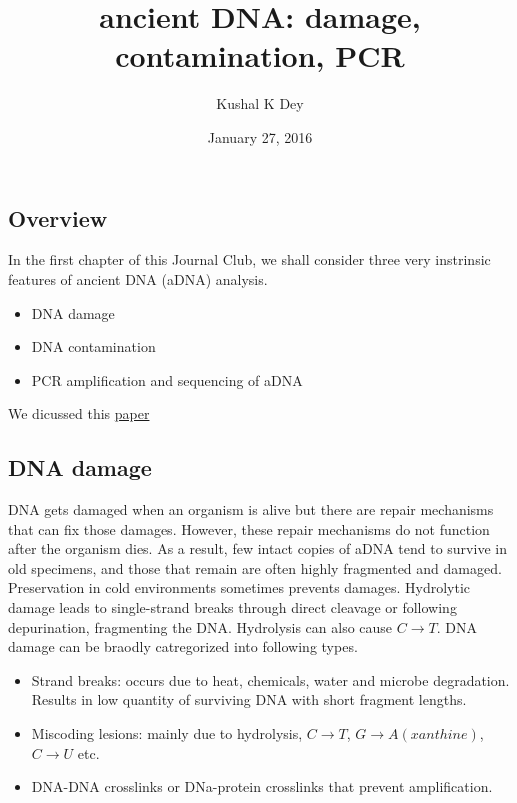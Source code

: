 \documentclass[]{article}
\title{ancient DNA: damage, contamination, PCR}
\author{Kushal K Dey}
\date{January 27, 2016}
\begin{document}
\maketitle


\subsection{Overview}\label{overview}

In the first chapter of this Journal Club, we shall consider three very
instrinsic features of ancient DNA (aDNA) analysis.

\begin{itemize}
\item DNA damage
\item DNA contamination 
\item PCR amplification and sequencing of aDNA 
\end{itemize}

We dicussed this
\href{http://journals.plos.org/plosone/article?id=10.1371/journal.pone.0034131}{paper}

\subsection{DNA damage}\label{dna-damage}

DNA gets damaged when an organism is alive but there are repair
mechanisms that can fix those damages. However, these repair mechanisms
do not function after the organism dies. As a result, few intact copies
of aDNA tend to survive in old specimens, and those that remain are
often highly fragmented and damaged. Preservation in cold environments
sometimes prevents damages. Hydrolytic damage leads to single-strand
breaks through direct cleavage or following depurination, fragmenting
the DNA. Hydrolysis can also cause \(C \rightarrow T\). DNA damage can
be braodly catregorized into following types.

\begin{itemize}
\item Strand breaks: occurs due to heat, chemicals, water and microbe degradation. Results in low quantity of surviving DNA with short fragment lengths. 
\item Miscoding lesions: mainly due to hydrolysis, $C \rightarrow T$, $G \rightarrow A (xanthine)$, $C \rightarrow U$ etc. 
\item DNA-DNA crosslinks or DNa-protein crosslinks that prevent amplification.
\end{itemize}
\end{document}
